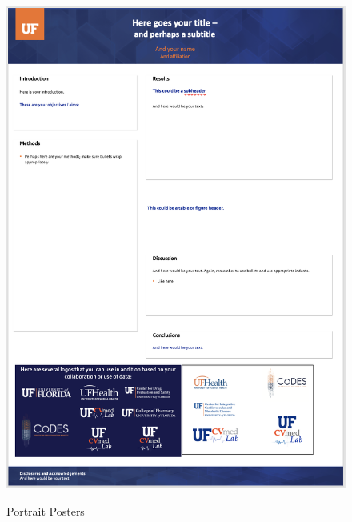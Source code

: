 \documentclass[
  letterpaper,
  DIV=11,
  numbers=noendperiod]{scrreprt}
\begin{document}
\begin{figure}
\begin{minipage}[t]{0.50\linewidth}
{{\href{/assets/templates/posters/poster-template-portrait-2019-UF.pptx}{\includegraphics{assets/templates/posters/poster-template-portrait-UF.png}}

}

}

\subcaption{\label{fig-anonymous-2}}
\end{minipage}%

\caption{\label{fig-portrait_posters}Portrait Posters}

\end{figure}
\end{document}
